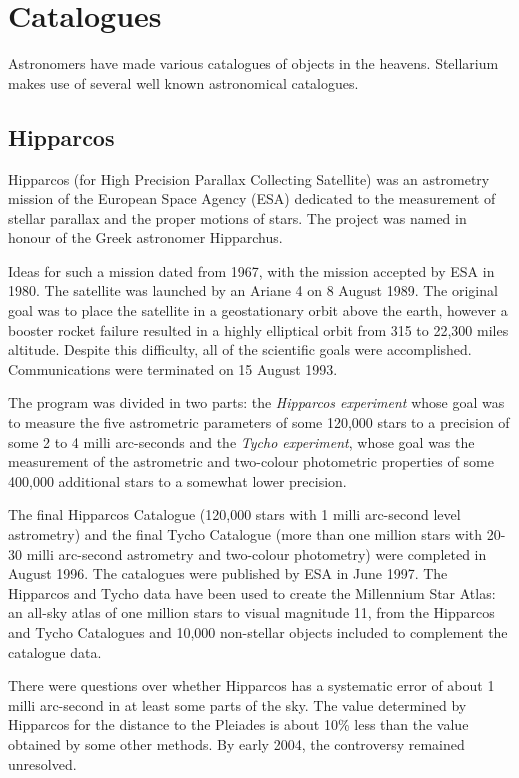 \section{Catalogues}\label{catalogues-1}

Astronomers have made various catalogues of objects in the heavens.
Stellarium makes use of several well known astronomical catalogues.

\subsection{Hipparcos}\label{hipparcos}

Hipparcos (for High Precision Parallax Collecting Satellite) was an
astrometry mission of the European Space Agency (ESA) dedicated to the
measurement of stellar parallax and the proper motions of stars. The
project was named in honour of the Greek astronomer Hipparchus.

Ideas for such a mission dated from 1967, with the mission accepted by
ESA in 1980. The satellite was launched by an Ariane 4 on 8 August 1989.
The original goal was to place the satellite in a geostationary orbit
above the earth, however a booster rocket failure resulted in a highly
elliptical orbit from 315 to 22,300 miles altitude. Despite this
difficulty, all of the scientific goals were accomplished.
Communications were terminated on 15 August 1993.

The program was divided in two parts: the \emph{Hipparcos experiment}
whose goal was to measure the five astrometric parameters of some
120,000 stars to a precision of some 2 to 4 milli arc-seconds and the
\emph{Tycho experiment}, whose goal was the measurement of the
astrometric and two-colour photometric properties of some 400,000
additional stars to a somewhat lower precision.

The final Hipparcos Catalogue (120,000 stars with 1 milli arc-second
level astrometry) and the final Tycho Catalogue (more than one million
stars with 20-30 milli arc-second astrometry and two-colour photometry)
were completed in August 1996. The catalogues were published by ESA in
June 1997. The Hipparcos and Tycho data have been used to create the
Millennium Star Atlas: an all-sky atlas of one million stars to visual
magnitude 11, from the Hipparcos and Tycho Catalogues and 10,000
non-stellar objects included to complement the catalogue data.

There were questions over whether Hipparcos has a systematic error of
about 1 milli arc-second in at least some parts of the sky. The value
determined by Hipparcos for the distance to the Pleiades is about 10\%
less than the value obtained by some other methods. By early 2004, the
controversy remained unresolved.

